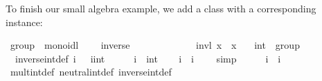 \begin{isabellebody}
%
\isadelimquote
%
\endisadelimquote
%
\begin{isamarkuptext}%
\noindent To finish our small algebra example, we add a  class
  with a corresponding instance:%
\end{isamarkuptext}%
\isamarkuptrue%
%
\isadelimquote
%
\endisadelimquote
%
\isatagquote
{}\isamarkupfalse%
\ group\ {\isacharequal}\ monoidl\ {\isacharplus}\isanewline
\ \ \ inverse\ {\isacharcolon}{\isacharcolon}\ {\isachardoublequoteopen}{\isasymalpha}\ {\isasymRightarrow}\ {\isasymalpha}{\isachardoublequoteclose}\ \ \ \ {\isacharparenleft}{\isachardoublequoteopen}{\isacharparenleft}{\isacharunderscore}{\isasymdiv}{\isacharparenright}{\isachardoublequoteclose}\ {\isacharbrackleft}{}{}{}{}{\isacharbrackright}\ {}{}{}{\isacharparenright}\isanewline
\ \ \ invl{\isacharcolon}\ {\isachardoublequoteopen}x{\isasymdiv}\ {\isasymotimes}\ x\ {\isacharequal}\ {\isasymone}{\isachardoublequoteclose}\isanewline
\isanewline
{}\isamarkupfalse%
\ int\ {\isacharcolon}{\isacharcolon}\ group\isanewline
{}\isanewline
\isanewline
{}\isamarkupfalse%
\isanewline
\ \ inverse{\isacharunderscore}int{\isacharunderscore}def{\isacharcolon}\ {\isachardoublequoteopen}i{\isasymdiv}\ {\isacharequal}\ {\isacharminus}\ {\isacharparenleft}i{\isasymColon}int{\isacharparenright}{\isachardoublequoteclose}\isanewline
\isanewline
{}\isamarkupfalse%
\ \isamarkupfalse%
\isanewline
\ \ \isamarkupfalse%
\ i\ {\isacharcolon}{\isacharcolon}\ int\isanewline
\ \ \isamarkupfalse%
\ {\isachardoublequoteopen}{\isacharminus}i\ {\isacharplus}\ i\ {\isacharequal}\ {}{\isachardoublequoteclose}\ \isamarkupfalse%
\ simp\isanewline
\ \ \isamarkupfalse%
\ \isamarkupfalse%
\ {\isachardoublequoteopen}i{\isasymdiv}\ {\isasymotimes}\ i\ {\isacharequal}\ {\isasymone}{\isachardoublequoteclose}\isanewline
\ \ \ \ \isamarkupfalse%
\ mult{\isacharunderscore}int{\isacharunderscore}def\ neutral{\isacharunderscore}int{\isacharunderscore}def\ inverse{\isacharunderscore}int{\isacharunderscore}def\ \isacommand{{\isachardot}}\isamarkupfalse%
\isanewline
{}\isamarkupfalse%
\isanewline
\isanewline
{}\isamarkupfalse%
%
\endisatagquote
{\isafoldquote}%
%
\isadelimquote
%
\endisadelimquote
%
\end{isabellebody}
